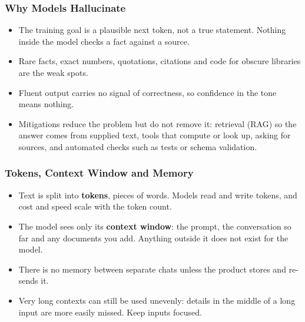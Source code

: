 
\begin{frame}[fragile]\frametitle{Why Models Hallucinate}
\begin{itemize}
\item The training goal is a plausible next token, not a true statement. Nothing inside the model checks a fact against a source.
\item Rare facts, exact numbers, quotations, citations and code for obscure libraries are the weak spots.
\item Fluent output carries no signal of correctness, so confidence in the tone means nothing.
\item Mitigations reduce the problem but do not remove it: retrieval (RAG) so the answer comes from supplied text, tools that compute or look up, asking for sources, and automated checks such as tests or schema validation.
\end{itemize}
\end{frame}

\begin{frame}[fragile]\frametitle{Tokens, Context Window and Memory}
\begin{itemize}
\item Text is split into \textbf{tokens}, pieces of words. Models read and write tokens, and cost and speed scale with the token count.
\item The model sees only its \textbf{context window}: the prompt, the conversation so far and any documents you add. Anything outside it does not exist for the model.
\item There is no memory between separate chats unless the product stores and re-sends it.
\item Very long contexts can still be used unevenly: details in the middle of a long input are more easily missed. Keep inputs focused.
\end{itemize}
\end{frame}

